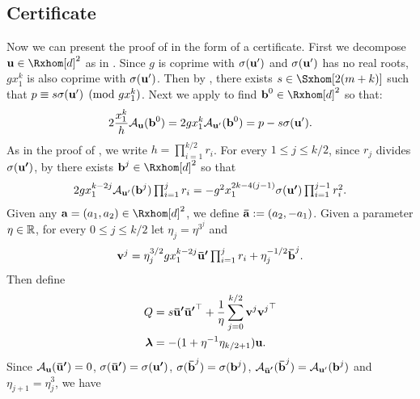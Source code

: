 \documentclass[final,onefignum,onetabnum]{siamart220329}
\begin{document}
\subsection{Certificate}
\label{sec:cert-general}
Now we can present the proof of  in the form of a
certificate. First we decompose $\vecp{u}\in \Rxhom[d]^2$ as in
. Since $g$ is coprime with $\sigma(\boldsymbol{\mathbf{u}}')$ and
$\sigma(\boldsymbol{\mathbf{u}}')$ has no real roots, $g x_1^k$ is also coprime with
$\sigma(\boldsymbol{\mathbf{u}}')$. Then by , there exists
$s \in \Sxhom[2(m+k)]$ such that $p \equiv s \sigma(\boldsymbol{\mathbf{u}}') \pmod{g x_1^k}$.
Next we apply  to find $\vecp{b}^0 \in \Rxhom[d]^2$ so
that:
\begin{align*}
  2 \frac{x_1^k}{h} \mathcal{A}_{\boldsymbol{\mathbf{u}}}(\boldsymbol{\mathbf{b}}^0) = 2g x_1^k\mathcal{A}_{\boldsymbol{\mathbf{u}}'}(\boldsymbol{\mathbf{b}}^0) = p - s \sigma(\boldsymbol{\mathbf{u}}').
\end{align*}
As in the proof of , we write
$h = \prod_{i=1}^{k/2} r_i$.  For every $1 \le j \le k/2$, since $r_j$ divides
$\sigma(\boldsymbol{\mathbf{u'}})$, by  there exists
$\vecp{b}^j \in \Rxhom[d]^2$ so that
\begin{align*}
  \textstyle
  2 g x_1^{k-2j} \mathcal{A}_{\boldsymbol{\mathbf{u}}'}(\boldsymbol{\mathbf{b}}^j) \prod_{i=1}^j r_i
  = -  g^2 x_1^{2k-4(j-1)} \sigma(\boldsymbol{\mathbf{u'}}) \prod_{i=1}^{j-1} r_i^2.
\end{align*}
Given any $\vecp{a} = (a_1, a_2) \in \Rxhom[d]^2$, we define
$\boldsymbol{\mathbf{\bar{a}}} := (a_2, -a_1)$. Given a parameter $\eta \in \mathbb{R}$, for every
$0 \le j \le k/2$ let $\eta_j = \eta^{3^j}$ and
\begin{align*}
  \textstyle
  \boldsymbol{\mathbf{v}}^j = \eta_j^{3/2} g x_1^{k-2j} \boldsymbol{\mathbf{\bar{u}'}} \prod_{i=1}^j r_i
  + \eta_j^{-1/2} \boldsymbol{\mathbf{\bar{b}}}^j.
\end{align*}
Then define
\begin{align*}
  Q &= s \boldsymbol{\mathbf{\bar{u}'}} \boldsymbol{\mathbf{\bar{u}'}}^\top + \frac{1}{\eta}\sum_{j=0}^{k/2} \boldsymbol{\mathbf{v}}^j {\boldsymbol{\mathbf{v}}^j}^\top \\
  \boldsymbol{\mathbf{\lambda}} &= -(1 + \eta^{-1}\eta_{k/2+1}) \boldsymbol{\mathbf{u}}.
\end{align*}
Since $\mathcal{A}_{\boldsymbol{\mathbf{u}}}(\boldsymbol{\mathbf{\bar{u}'}}) = 0$, $\sigma(\boldsymbol{\mathbf{\bar{u}'}}) = \sigma(\boldsymbol{\mathbf{u'}})$,
$\sigma(\boldsymbol{\mathbf{\bar{b}}}^j) = \sigma(\boldsymbol{\mathbf{b}}^j)$,
$\mathcal{A}_{\boldsymbol{\mathbf{\bar{u}'}}}(\boldsymbol{\mathbf{\bar{b}}}^j) = \mathcal{A}_{\boldsymbol{\mathbf{u}}'}(\boldsymbol{\mathbf{b}}^j)$ and
$\eta_{j+1} = \eta_j^3$, we have
\end{document}
